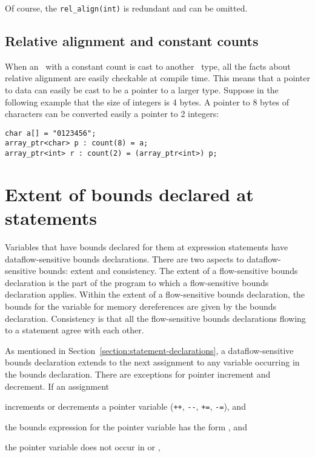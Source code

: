 Of course, the \texttt{rel\_align(int)} is redundant and can be omitted.

\subsection{Relative alignment and constant counts}

When an \arrayptr\ with a constant count is cast to another
\arrayptr\ type, all the facts about relative alignment are
easily checkable at compile time. This means that a pointer to data can
easily be cast to be a pointer to a larger type. Suppose in the
following example that the size of integers is 4 bytes. A pointer to 8
bytes of characters can be converted easily a pointer to 2 integers:

\begin{lstlisting}
char a[] = "0123456";
array_ptr<char> p : count(8) = a;
array_ptr<int> r : count(2) = (array_ptr<int>) p;
\end{lstlisting}

\section{Extent of bounds declared at statements}
\label{section:extent-of-declarations}

Variables that have bounds declared for them at expression statements
have dataflow-sensitive bounds declarations. There are two aspects to
dataflow-sensitive bounds: extent and consistency. The extent of a
flow-sensitive bounds declaration is the part of the program to which 
a flow-sensitive bounds
declaration applies. Within the extent of a flow-sensitive 
bounds declaration, the
bounds for the variable for memory dereferences are given by the bounds
declaration. Consistency is that all the flow-sensitive bounds 
declarations flowing to a statement agree with each other.

As mentioned in Section~\ref{section:statement-declarations},
a dataflow-sensitive bounds declaration
extends to the next assignment to any variable occurring in the bounds
declaration. There are exceptions for pointer increment and decrement.
If an assignment

\begin{compactitem}
\item
  increments or decrements a pointer variable (\texttt{++},
  \texttt{-\/-}, \texttt{+=}, \texttt{-=}), and
\item
  the bounds expression for the pointer variable has the form
  , and
\item
  the pointer variable does not occur in  or ,
\end{compactitem}

